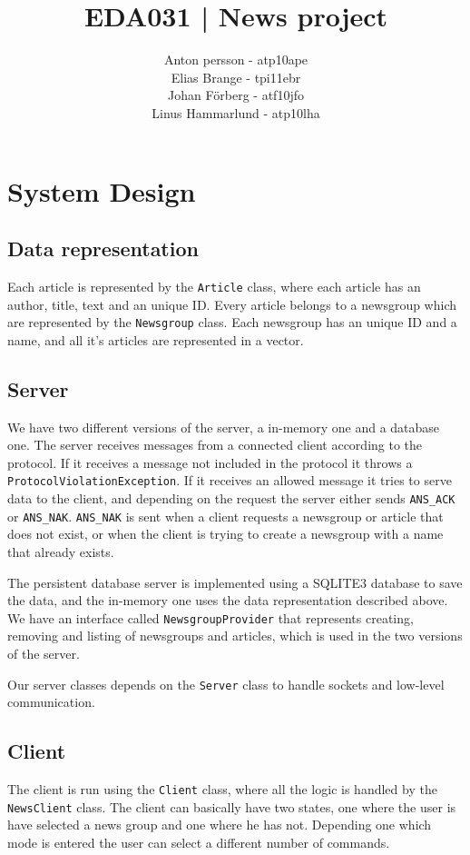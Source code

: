 \documentclass[12pt]{article}
\title{EDA031 | News project}
\author{Anton persson - atp10ape\\
		Elias Brange - tpi11ebr\\
		Johan Förberg - atf10jfo\\
		Linus Hammarlund - atp10lha}
\begin{document}
\maketitle
\newpage

\section{System Design}

\subsection{Data representation}
Each article is represented by the \verb!Article! class, where each article has an author, title, text and an unique ID. Every article belongs to a newsgroup which are represented by the \verb!Newsgroup! class. Each newsgroup has an unique ID and a name, and all it's articles are represented in a vector.

\subsection{Server}
We have two different versions of the server, a in-memory one and a database one. The server receives messages from a connected client according to the protocol. If it receives a message not included in the protocol it throws a \verb!ProtocolViolationException!. If it receives an allowed message it tries to serve data to the client, and depending on the request the server either sends \verb!ANS_ACK! or \verb!ANS_NAK!. \verb!ANS_NAK! is sent when a client requests a newsgroup or article that does not exist, or when the client is trying to create a newsgroup with a name that already exists.

The persistent database server is implemented using a SQLITE3 database to save the data, and the in-memory one uses the data representation described above. We have an interface called \verb!NewsgroupProvider! that represents creating, removing and listing of newsgroups and articles, which is used in the two versions of the server.

Our server classes depends on the \verb!Server! class to handle sockets and low-level communication.

\subsection{Client}
The client is run using the \verb!Client! class, where all the logic is handled by the \verb!NewsClient! class. The client can basically have two states, one where the user is have selected a news group and one where he has not. Depending one which mode is entered the user can select a different number of commands.
\end{document}
